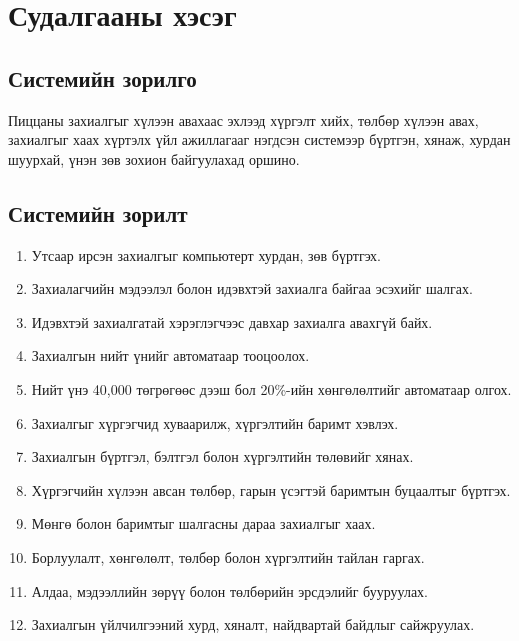 
\chapter{Судалгааны хэсэг} %
\label{Chapter1} %



\section*{Системийн зорилго}

Пиццаны захиалгыг хүлээн авахаас эхлээд хүргэлт хийх, төлбөр хүлээн авах, захиалгыг хаах хүртэлх үйл ажиллагааг нэгдсэн системээр бүртгэн, хянаж, хурдан шуурхай, үнэн зөв зохион байгуулахад оршино.


\section{Системийн зорилт}
\begin{enumerate}
    \item Утсаар ирсэн захиалгыг компьютерт хурдан, зөв бүртгэх.
    \item Захиалагчийн мэдээлэл болон идэвхтэй захиалга байгаа эсэхийг шалгах.
    \item Идэвхтэй захиалгатай хэрэглэгчээс давхар захиалга авахгүй байх.
    \item Захиалгын нийт үнийг автоматаар тооцоолох.
    \item Нийт үнэ 40,000 төгрөгөөс дээш бол 20\%-ийн хөнгөлөлтийг автоматаар олгох.
    \item Захиалгыг хүргэгчид хуваарилж, хүргэлтийн баримт хэвлэх.
    \item Захиалгын бүртгэл, бэлтгэл болон хүргэлтийн төлөвийг хянах.
    \item Хүргэгчийн хүлээн авсан төлбөр, гарын үсэгтэй баримтын буцаалтыг бүртгэх.
    \item Мөнгө болон баримтыг шалгасны дараа захиалгыг хаах.
    \item Борлуулалт, хөнгөлөлт, төлбөр болон хүргэлтийн тайлан гаргах.
    \item Алдаа, мэдээллийн зөрүү болон төлбөрийн эрсдэлийг бууруулах.
    \item Захиалгын үйлчилгээний хурд, хяналт, найдвартай байдлыг сайжруулах.
\end{enumerate}


